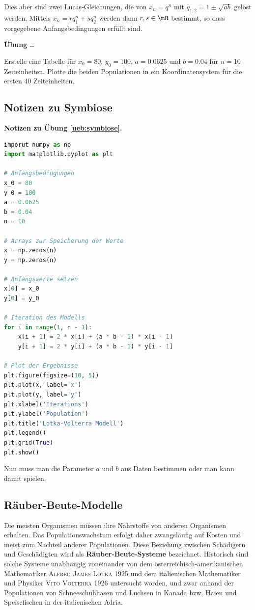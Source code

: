 \documentclass[%
11pt,%
twoside,%
titlepage,%
german,%
headsepline%
]{scrartcl}
\newcommand{\faEyeLightGray}{\textcolor{lightgray}{\faEye}} %
\newcommand{\concatueb}[1]{ueb:#1}%
\newcommand{\concatlsg}[1]{lsg:#1}%
\newcounter{uebcounter}[section]
\renewcommand{\theuebcounter}{\thesection.\arabic{uebcounter}}  %
\newenvironment{lsg}[1]{%
    \par\noindent\textbf{Notizen zu Übung \ref{\concatueb{#1}}.}%
    \label{\concatlsg{#1}}
}{%
    \par%
}
\newenvironment{uebenv}[1]{%
    \refstepcounter{uebcounter}
    \par\noindent\textbf{Übung \theuebcounter.}%
    \label{\concatueb{#1}}\hfill\hyperref[\concatlsg{#1}]{\faEyeLightGray}\par
}{%
    \par
}
\begin{document}
Dies aber sind zwei Lucas-Gleichungen, die von $x_n = q^n$ mit $q_{1,2} = 1\pm\sqrt{ab}$ gelöst werden. Mittels $x_n=rq_1^n+sq_2^n$ werden dann $r,s\in\mR$ bestimmt, so dass vorgegebene Anfangsbedingungen erfüllt sind.

\begin{uebenv}{symbiose}
Erstelle eine Tabelle für $x_0=80$, $y_0=100$, $a=0.0625$ und $b=0.04$ für $n=10$ Zeiteinheiten. Plotte die beiden Populationen in ein Koordinatensystem für die ersten 40 Zeiteinheiten.
\end{uebenv}

\subsection{Notizen zu Symbiose}

\begin{lsg}{symbiose}
    \begin{lstlisting}[language=python]
imporut numpy as np
import matplotlib.pyplot as plt

# Anfangsbedingungen
x_0 = 80
y_0 = 100
a = 0.0625
b = 0.04
n = 10

# Arrays zur Speicherung der Werte
x = np.zeros(n)
y = np.zeros(n)

# Anfangswerte setzen
x[0] = x_0
y[0] = y_0

# Iteration des Modells
for i in range(1, n - 1):
    x[i + 1] = 2 * x[i] + (a * b - 1) * x[i - 1]
    y[i + 1] = 2 * y[i] + (a * b - 1) * y[i - 1]

# Plot der Ergebnisse
plt.figure(figsize=(10, 5))
plt.plot(x, label='x')
plt.plot(y, label='y')
plt.xlabel('Iterations')
plt.ylabel('Population')
plt.title('Lotka-Volterra Modell')
plt.legend()
plt.grid(True)
plt.show()

    \end{lstlisting}

    Nun muss man die Parameter $a$ und $b$ aus Daten bestimmen oder man kann damit spielen.
\end{lsg}

\clearpage

\subsection{Räuber-Beute-Modelle}

Die meisten Organismen müssen ihre Nährstoffe von anderen Organismen erhalten. Das Populationswachstum erfolgt daher zwangsläufig auf Kosten und meist zum Nachteil anderer Populationen. Diese Beziehung zwischen Schädigern und Geschädigten wird als \textbf{Räuber-Beute-Systeme} bezeichnet. Historisch sind solche Systeme unabhängig voneinander von dem österreichisch-amerikanischen Mathematiker \textsc{Alfred James Lotka} 1925 und dem italienischen
Mathematiker und Physiker \textsc{Vito Volterra} 1926 untersucht worden, und zwar anhand der Populationen von Schneeschuhhasen und Luchsen in Kanada bzw. Haien und Speisefischen in der italienischen Adria.
\end{document}
